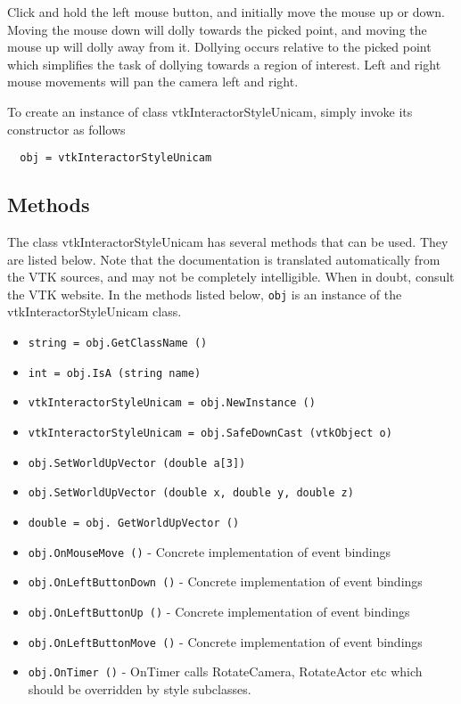  Click and hold the left mouse button, and initially move the mouse up or
 down.  Moving the mouse down will dolly towards the picked point, and moving
 the mouse up will dolly away from it.  Dollying occurs relative to the
 picked point which simplifies the task of dollying towards a region of
 interest. Left and right mouse movements will pan the camera left and right.
 

To create an instance of class vtkInteractorStyleUnicam, simply
invoke its constructor as follows
\begin{verbatim}
  obj = vtkInteractorStyleUnicam
\end{verbatim}
\subsection{Methods}

The class vtkInteractorStyleUnicam has several methods that can be used.
  They are listed below.
Note that the documentation is translated automatically from the VTK sources,
and may not be completely intelligible.  When in doubt, consult the VTK website.
In the methods listed below, \verb|obj| is an instance of the vtkInteractorStyleUnicam class.
\begin{itemize}
\item  \verb|string = obj.GetClassName ()|

\item  \verb|int = obj.IsA (string name)|

\item  \verb|vtkInteractorStyleUnicam = obj.NewInstance ()|

\item  \verb|vtkInteractorStyleUnicam = obj.SafeDownCast (vtkObject o)|

\item  \verb|obj.SetWorldUpVector (double a[3])|

\item  \verb|obj.SetWorldUpVector (double x, double y, double z)|

\item  \verb|double = obj. GetWorldUpVector ()|

\item  \verb|obj.OnMouseMove ()| -  Concrete implementation of event bindings

\item  \verb|obj.OnLeftButtonDown ()| -  Concrete implementation of event bindings

\item  \verb|obj.OnLeftButtonUp ()| -  Concrete implementation of event bindings

\item  \verb|obj.OnLeftButtonMove ()| -  Concrete implementation of event bindings

\item  \verb|obj.OnTimer ()| -  OnTimer calls RotateCamera, RotateActor etc which should be overridden by
 style subclasses.

\end{itemize}
